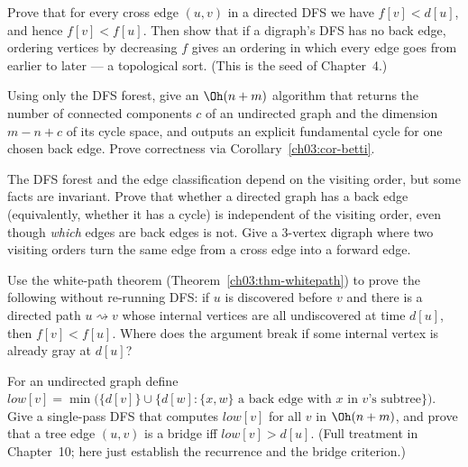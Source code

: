 \begin{exercise}\label{ch03:ex-cross}
Prove that for every cross edge $(u,v)$ in a directed DFS we have $f[v]<d[u]$, and hence $f[v]<f[u]$. Then show that if a digraph's DFS has no back edge, ordering vertices by decreasing $f$ gives an ordering in which every edge goes from earlier to later --- a topological sort. (This is the seed of Chapter~4.)
\end{exercise}

\begin{exercise}\label{ch03:ex-betti}
Using only the DFS forest, give an $\Oh(n+m)$ algorithm that returns the number of connected components $c$ of an undirected graph and the dimension $m-n+c$ of its cycle space, and outputs an explicit fundamental cycle for one chosen back edge. Prove correctness via Corollary~\ref{ch03:cor-betti}.
\end{exercise}

\begin{exercise}\label{ch03:ex-order}
The DFS forest and the edge classification depend on the visiting order, but some facts are invariant. Prove that whether a directed graph has a back edge (equivalently, whether it has a cycle) is independent of the visiting order, even though \emph{which} edges are back edges is not. Give a 3-vertex digraph where two visiting orders turn the same edge from a cross edge into a forward edge.
\end{exercise}

\begin{exercise}\label{ch03:ex-whitepath}
Use the white-path theorem (Theorem~\ref{ch03:thm-whitepath}) to prove the following without re-running DFS: if $u$ is discovered before $v$ and there is a directed path $u\rightsquigarrow v$ whose internal vertices are all undiscovered at time $d[u]$, then $f[v]<f[u]$. Where does the argument break if some internal vertex is already gray at $d[u]$?
\end{exercise}

\begin{exercise}\label{ch03:ex-low}
For an undirected graph define $\mathit{low}[v]=\min\big(\{d[v]\}\cup\{d[w] : \{x,w\}\text{ a back edge with }x\text{ in }v\text{'s subtree}\}\big)$. Give a single-pass DFS that computes $\mathit{low}[v]$ for all $v$ in $\Oh(n+m)$, and prove that a tree edge $(u,v)$ is a bridge iff $\mathit{low}[v]>d[u]$. (Full treatment in Chapter~10; here just establish the recurrence and the bridge criterion.)
\end{exercise}

